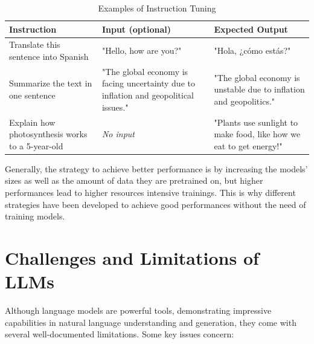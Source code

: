 \begin{table}[b]
    \centering
    \renewcommand{\arraystretch}{1.3}
    \begin{tabularx}{\textwidth}{|X|X|X|}
        \hline
        \textbf{Instruction} & \textbf{Input (optional)} & \textbf{Expected Output} \\
        \hline
        Translate this sentence into Spanish & "Hello, how are you?" & "Hola, ¿cómo estás?" \\
        \hline
        Summarize the text in one sentence & "The global economy is facing uncertainty due to inflation and geopolitical issues." & "The global economy is unstable due to inflation and geopolitics." \\
        \hline
        Explain how photosynthesis works to a 5-year-old & \textit{No input} & "Plants use sunlight to make food, like how we eat to get energy!" \\
        \hline
    \end{tabularx}
    \caption{Examples of Instruction Tuning}
    \label{tab:instruction-tuning}
\end{table}

Generally, the strategy to achieve better performance is by increasing the models’ sizes as well as the amount of data they are pretrained on, but higher performances lead to higher resources intensive trainings. This is why different strategies have been developed to achieve good performances without the need of training models.




\section{Challenges and Limitations of LLMs}
\label{sec:challenges-llms}

Although language models are powerful tools, demonstrating impressive capabilities in natural language understanding and generation, they come with several well-documented limitations. Some key issues concern:

